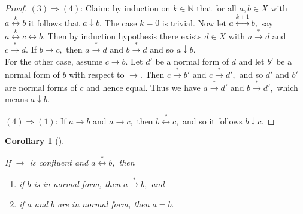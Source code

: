 \documentclass[
  letterpaper,
  10pt,
  reqno,
  twopage,
  openany]{book}
\providecommand{\tightlist}{%
  \setlength{\itemsep}{0pt}\setlength{\parskip}{0pt}}\usepackage{longtable,booktabs,array}
\theoremstyle{plain}
\theoremstyle{definition}
\theoremstyle{definition}
\theoremstyle{definition}
\theoremstyle{plain}
\newtheorem{corollary}{Corollary}[chapter]
\theoremstyle{plain}
\theoremstyle{remark}
\begin{document}
\begin{proof}
\par

\((3)\Rightarrow(4)\): Claim: by induction on \(k\in \mathbb{N}\) that
for all \(a, b \in X\) with \(a \stackrel{k}{\longleftrightarrow} b\) it
follows that \(a \downarrow b.\) The case \(k=0\) is trivial. Now let
\(a \stackrel{k+1}{\longleftrightarrow} b,\) say
\(a \stackrel{k}{\longleftrightarrow} c \longleftrightarrow b.\) Then by
induction hypothesis there exists \(d \in X\) with
\(a \stackrel{*}{\longrightarrow} d\) and
\(c \stackrel{*}{\longrightarrow} d.\) If \(b \longrightarrow c,\) then
\(a \stackrel{*}{\longrightarrow} d\) and
\(b \stackrel{*}{\longrightarrow} d\) and so \(a \downarrow b.\)\\
For the other case, assume \(c \longrightarrow b.\) Let \(d'\) be a
normal form of \(d\) and let \(b'\) be a normal form of \(b\) with
respect to \(\longrightarrow.\) Then
\(c \stackrel{*}{\longrightarrow} b'\) and
\(c \stackrel{*}{\longrightarrow} d',\) and so \(d'\) and \(b'\) are
normal forms of \(c\) and hence equal. Thus we have
\(a \stackrel{*}{\longrightarrow} d'\) and
\(b \stackrel{*}{\longrightarrow} d',\) which means \(a \downarrow b.\)

\begin{figure}[htbp]
\centering
\end{figure}

\((4)\Rightarrow(1)\): If \(a \longrightarrow b\) and
\(a \longrightarrow c,\) then \(b \stackrel{*}{\longleftrightarrow} c,\)
and so it follows \(b \downarrow c.\)

\end{proof}

\leavevmode{}%
\begin{corollary}[]\label{cor-normal-form-confluent}

If \(\longrightarrow\) is confluent and
\(a\stackrel{*}{\longleftrightarrow} b,\) then

\begin{enumerate}
\def\labelenumi{\arabic{enumi}.}
\tightlist
\item
  if \(b\) is in normal form, then \(a\stackrel{*}{\longrightarrow} b,\)
  and
\item
  if \(a\) and \(b\) are in normal form, then \(a=b.\)
\end{enumerate}

\end{corollary}
\end{document}
